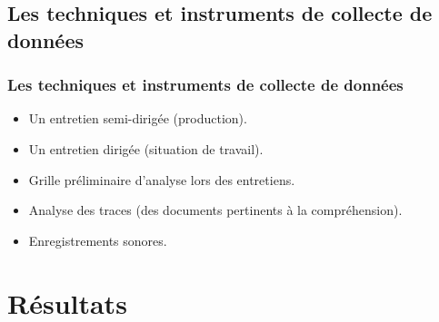                       		 \subsection{Les techniques et instruments de collecte de données} 
					\begin{frame}[allowframebreaks]
						\frametitle{Les techniques et instruments de collecte de données}
                        
                        			\begin{itemize} 
                       				\item Un entretien semi-dirigée (production).
                       				\item Un entretien dirigée (situation de travail).
							\item Grille préliminaire d’analyse lors des entretiens.
							\item Analyse des traces (des documents pertinents à la compréhension).
							\item Enregistrements sonores.
						\end{itemize}
                       		           
                			\end{frame}
                
                  \section{Résultats} 
							
